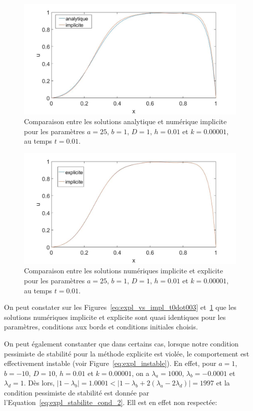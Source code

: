 \documentclass[a4paper, 12pt]{report}
\begin{document}
\begin{figure}[H]
  \center
  \includegraphics[scale=0.4]{images/analy_vs_impl_t_end_0dot01.jpg}
  \caption{Comparaison entre les solutions analytique et numérique implicite pour
  les paramètres $a=25$, $b=1$, $D=1$, $h=0.01$ et $k=0.00001$, au temps $t=0.01$.}
\end{figure}

\begin{figure}[H]
  \center
  \includegraphics[scale=0.4]{images/expl_vs_impl_t_end_0dot01.jpg}
  \caption{Comparaison entre les solutions numériques implicite et explicite pour
  les paramètres $a=25$, $b=1$, $D=1$, $h=0.01$ et $k=0.00001$, au temps $t=0.01$.}
  \label{eq:expl_vs_impl_t0dot01}
\end{figure}

On peut constater sur les Figures~\ref{eq:expl_vs_impl_t0dot003} et~\ref{eq:expl_vs_impl_t0dot01}
que les solutions numériques implicite et explicite sont quasi identiques pour
les paramètres, conditions aux bords et conditions initiales choisis.

On peut également constanter que dans certains cas, lorsque notre condition pessimiste
de stabilité pour la méthode explicite est violée, le comportement est
effectivement instable (voir Figure~\ref{eq:expl_instable}). En effet,
pour $a=1$, $b=-10$, $D=10$, $h=0.01$ et $k=0.00001$, on a $\lambda_a = 1000$,
$\lambda_b = -0.0001$ et $\lambda_d = 1$. Dès lors,
$|1-\lambda_b| = 1.0001 < |1-\lambda_b + 2 (\lambda_a-2\lambda_d)| = 1997$
et la condition pessimiste de stabilité est donnée par l'Equation~\ref{eq:expl_stabilite_cond_2}.
Ell est en effet non respectée:
\end{document}
